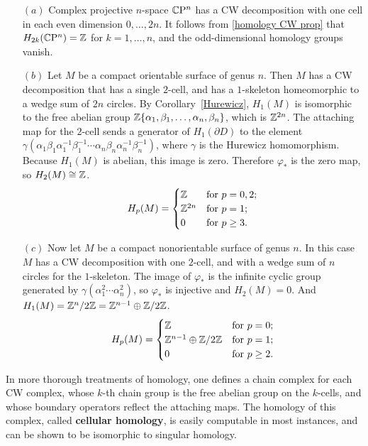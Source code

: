 \begin{example}
\mbox{}
\begin{itemize}
\item[$(a)$]Complex projective $n$-space $\mathbb{C}\mathrm{P}^n$ has a CW decomposition with one cell in each even dimension $0,\dots,2n$. It follows from \cref{homology CW prop} that $H_{2k}(\mathbb{C}\mathrm{P}^n)=\mathbb{Z}$ for $k=1,\dots,n$, and the odd-dimensional homology groups vanish.
\item[$(b)$]Let $M$ be a compact orientable surface of genus $n$. Then $M$ has a CW decomposition that has a single $2$-cell, and has a $1$-skeleton homeomorphic to a 
wedge sum of $2n$ circles. By Corollary~\ref{Hurewicz}, $H_1(M)$ is isomorphic to the free abelian group $\mathbb{Z}\{\alpha_1,\beta_1,\dots,\alpha_n,\beta_n\}$, which is 
$\mathbb{Z}^{2n}$. The attaching map for the $2$-cell sends a generator of $H_1(\partial D)$ to the element $\gamma(\alpha_1\beta_1\alpha_1^{-1}\beta_1^{-1}\cdots\alpha_n\beta_n\alpha_n^{-1}\beta_n^{-1})$, where $\gamma$ is the Hurewicz homomorphism. Because $H_1(M)$ is abelian, this image is zero. Therefore $\varphi_*$ is the zero map, so $H_2(M)\cong\mathbb{Z}$.
\[H_p(M)=\begin{cases}
\mathbb{Z}&\text{for }p=0,2;\\
\mathbb{Z}^{2n}&\text{for }p=1;\\
0&\text{for }p\geq 3.
\end{cases}\]
\item[$(c)$]Now let $M$ be a compact nonorientable surface of genus $n$. In this case $M$ has a CW decomposition with one $2$-cell, and with a wedge sum of $n$ circles for the $1$-skeleton. The image of $\varphi_*$ is the infinite cyclic group generated by $\gamma(\alpha_1^2\cdots\alpha_n^2)$, so $\varphi_*$ is injective and $H_2(M)=0$. And $H_1(M)=\mathbb{Z}^n/2\mathbb{Z}=\mathbb{Z}^{n-1}\oplus\mathbb{Z}/2\mathbb{Z}$.
\[H_p(M)=\begin{cases}
\mathbb{Z}&\text{for }p=0;\\
\mathbb{Z}^{n-1}\oplus\mathbb{Z}/2\mathbb{Z}&\text{for }p=1;\\
0&\text{for }p\geq 2.
\end{cases}\]
\end{itemize}
\end{example}
In more thorough treatments of homology, one defines a chain complex for each CW complex, whose $k$-th chain group is the free abelian group on the $k$-cells, and whose boundary operators reflect the attaching maps. The homology of this complex, called \textbf{cellular homology}, is easily computable in most instances, and can be shown to be isomorphic to singular homology.
